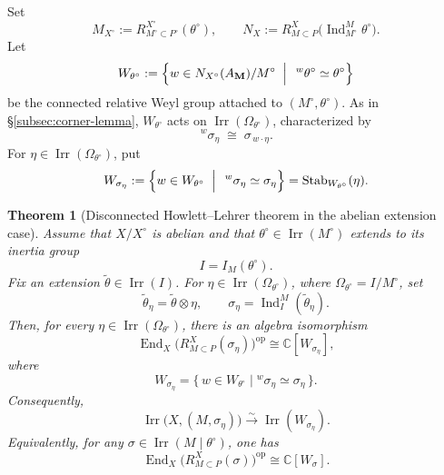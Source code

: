\documentclass{amsart}
\theoremstyle{plain}
\numberwithin{equation}{section}
\newtheorem{theorem}{Theorem}[section]
\theoremstyle{definition}
\newcommand{\op}{\operatorname{op}}
\newcommand{\Ind}{\operatorname{Ind}}
\newcommand{\End}{\operatorname{End}}
\newcommand{\Irr}{\operatorname{Irr}}
\newcommand{\Stab}{\operatorname{Stab}}
\newcommand{\bM}{\mathbf{M}}
\newcommand{\C}{\mathbb{C}}
\begin{document}
Set
\[
M_{X^\circ}:=R^{X^\circ}_{M^\circ\subset P^\circ}(\theta^\circ),
\qquad
N_X:=R^X_{M\subset P}\!\bigl(\Ind_{M^\circ}^{M}\theta^\circ\bigr).
\]
Let
\[
W_{\theta^\circ}
:=
\Bigl\{
w\in N_{X^\circ}(A_{\bM})/M^\circ
\;\Bigm|\;
{}^{\,w}\theta^\circ\simeq \theta^\circ
\Bigr\}
\]
be the connected relative Weyl group attached to \((M^\circ,\theta^\circ)\).
As in \S\ref{subsec:corner-lemma}, \(W_{\theta^\circ}\) acts on
\(\Irr(\Omega_{\theta^\circ})\), characterized by
\[
{}^{\,w}\sigma_\eta \;\cong\; \sigma_{\,w\cdot\eta}.
\]
For \(\eta\in \Irr(\Omega_{\theta^\circ})\), put
\[
W_{\sigma_\eta}
:=
\Bigl\{
w\in W_{\theta^\circ}\;\Bigm|\;{}^{\,w}\sigma_\eta\simeq \sigma_\eta
\Bigr\}
=
\Stab_{W_{\theta^\circ}}(\eta).
\]
%
\begin{theorem}[Disconnected Howlett--Lehrer theorem in the abelian extension case]
\label{thm:disc-HL-abelian}
Assume that \(X/X^\circ\) is abelian and that
\(\theta^\circ\in \Irr(M^\circ)\) extends to its inertia group
\[
I=I_M(\theta^\circ).
\]
Fix an extension \(\widetilde\theta\in\Irr(I)\). For
\(\eta\in\Irr(\Omega_{\theta^\circ})\), where
\(\Omega_{\theta^\circ}=I/M^\circ\), set
\[
\widetilde\theta_\eta=\widetilde\theta\otimes\eta,
\qquad
\sigma_\eta=\Ind_I^M(\widetilde\theta_\eta).
\]
Then, for every \(\eta\in\Irr(\Omega_{\theta^\circ})\), there is an algebra
isomorphism
\[
\End_X\!\bigl(R^X_{M\subset P}(\sigma_\eta)\bigr)^{\op}
\cong
\C[W_{\sigma_\eta}],
\]
where
\[
W_{\sigma_\eta}
=
\{\,w\in W_{\theta^\circ}\mid {}^w\sigma_\eta\simeq\sigma_\eta\,\}.
\]
Consequently,
\[
\Irr\bigl(X,(M,\sigma_\eta)\bigr)
\xrightarrow{\sim}
\Irr(W_{\sigma_\eta}).
\]
Equivalently, for any \(\sigma\in\Irr(M\mid\theta^\circ)\), one has
\[
\End_X\!\bigl(R^X_{M\subset P}(\sigma)\bigr)^{\op}
\cong
\C[W_\sigma].
\]
\end{theorem}
\end{document}
